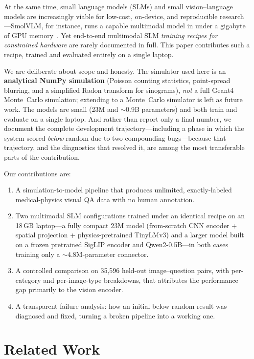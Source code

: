 \documentclass[11pt]{article}
\begin{document}
At the same time, small language models (SLMs) and small vision--language models
are increasingly viable for low-cost, on-device, and reproducible
research---SmolVLM, for instance, runs a capable multimodal model in under a
gigabyte of GPU memory~\cite{marafioti2025smolvlm}. Yet end-to-end multimodal SLM
\emph{training recipes for constrained hardware} are rarely documented in full.
This paper contributes such a recipe, trained and evaluated entirely on a single
laptop.

We are deliberate about scope and honesty. The simulator used here is an
\textbf{analytical NumPy simulation} (Poisson counting statistics, point-spread
blurring, and a simplified Radon transform for sinograms), \emph{not} a full
Geant4 Monte~Carlo simulation; extending to a Monte~Carlo simulator is left as
future work. The models are small (23M and $\sim$0.9B parameters) and both train
and evaluate on a single laptop. And rather
than report only a final number, we document the complete development
trajectory---including a phase in which the system scored \emph{below} random due
to two compounding bugs---because that trajectory, and the diagnostics that
resolved it, are among the most transferable parts of the contribution.

Our contributions are:
\begin{enumerate}[leftmargin=*]
    \item A simulation-to-model pipeline that produces unlimited,
    exactly-labeled medical-physics visual QA data with no human annotation.
    \item Two multimodal SLM configurations trained under an identical recipe on
    an 18\,GB laptop---a fully compact 23M model (from-scratch CNN encoder +
    spatial projection + physics-pretrained TinyLMv3) and a larger model built on
    a frozen pretrained SigLIP encoder and Qwen2-0.5B---in both cases training only
    a $\sim$4.8M-parameter connector.
    \item A controlled comparison on 35{,}596 held-out image--question pairs,
    with per-category and per-image-type breakdowns, that attributes the
    performance gap primarily to the vision encoder.
    \item A transparent failure analysis: how an initial below-random result was
    diagnosed and fixed, turning a broken pipeline into a working one.
\end{enumerate}

\section{Related Work}
\label{sec:related}
\end{document}
